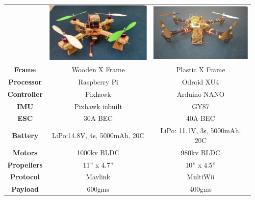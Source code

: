 \documentclass[12pt]{article}
\begin{document}
\begin{center}
\begin{tabular}{ |c|c|c| }
 \hline
  & \includegraphics[scale=0.3]{image01-2} & \includegraphics[scale=0.3]{image08-1} \\
 \textbf{Frame} & Wooden X Frame & Plastic X Frame \\
 \textbf{Processor} & Raspberry Pi & Odroid XU4 \\
 \textbf{Controller} & Pixhawk & Arduino NANO \\
 \textbf{IMU} & Pixhawk inbuilt & GY87\\
 \textbf{ESC} & 30A BEC & 40A BEC\\
 \textbf{Battery} & LiPo:14.8V, 4s, 5000mAh, 20C & LiPo: 11.1V, 3s, 5000mAh, 20C \\
 \textbf{Motors} & 1000kv BLDC & 980kv BLDC \\
 \textbf{Propellers} & 11” x 4.7” & 10” x 4.5” \\
 \textbf{Protocol} & Mavlink & MultiWii\\
 \textbf{Payload} & 600gms & 400gms \\
 \hline
\end{tabular}
\end{center}
\end{document}
